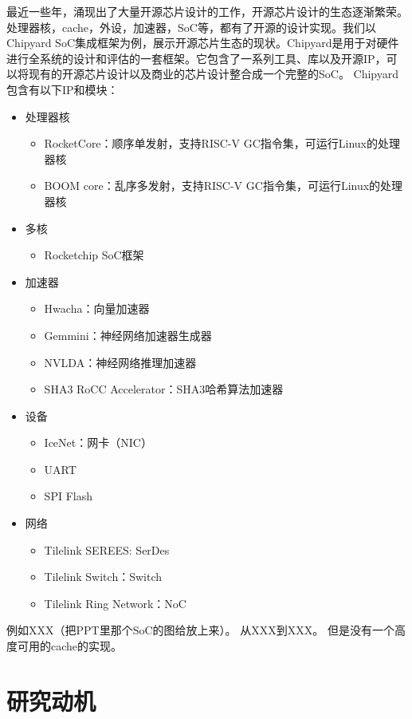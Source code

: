 最近一些年，涌现出了大量开源芯片设计的工作，开源芯片设计的生态逐渐繁荣。处理器核，cache，外设，加速器，SoC等，都有了开源的设计实现。我们以Chipyard SoC集成框架为例，展示开源芯片生态的现状。Chipyard是用于对硬件进行全系统的设计和评估的一套框架。它包含了一系列工具、库以及开源IP，可以将现有的开源芯片设计以及商业的芯片设计整合成一个完整的SoC。
Chipyard包含有以下IP和模块：
\begin{itemize}
	\item 处理器核
		\begin{itemize}
			\item RocketCore：顺序单发射，支持RISC-V GC指令集，可运行Linux的处理器核
			\item BOOM core：乱序多发射，支持RISC-V GC指令集，可运行Linux的处理器核
		\end{itemize}
	\item 多核
		\begin{itemize}
			\item Rocketchip SoC框架
		\end{itemize}
	\item 加速器
		\begin{itemize}
			\item Hwacha：向量加速器
			\item Gemmini：神经网络加速器生成器
			\item NVLDA：神经网络推理加速器
			\item SHA3 RoCC Accelerator：SHA3哈希算法加速器
		\end{itemize}
	\item 设备
		\begin{itemize}
			\item IceNet：网卡（NIC）
			\item UART
			\item SPI Flash
		\end{itemize}
	\item 网络
		\begin{itemize}
			\item Tilelink SEREES: SerDes
			\item Tilelink Switch：Switch
			\item Tilelink Ring Network：NoC
		\end{itemize}
\end{itemize}



例如XXX（把PPT里那个SoC的图给放上来）。
从XXX到XXX。
但是没有一个高度可用的cache的实现。

\section{研究动机}

